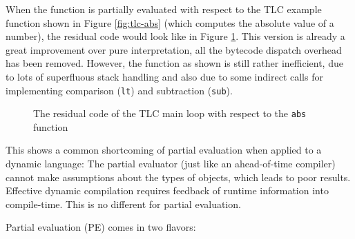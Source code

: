 When the function is partially evaluated with respect to the TLC example
function shown in Figure \ref{fig:tlc-abs} (which computes the absolute value of a number),
the residual code would look like in Figure \ref{fig:tlc-folded}. This version
is already a great improvement over pure interpretation, all the bytecode
dispatch overhead has been removed. However, the function as shown is still
rather inefficient, due to lots of superfluous stack handling and also due to
some indirect calls for implementing comparison (\lstinline{lt}) and
subtraction (\lstinline{sub}).

\begin{figure}[h]
\begin{center}

\caption{The residual code of the TLC main loop with respect to the
\lstinline{abs} function }
\label{fig:tlc-folded}
\end{center}
\end{figure}

This shows a common shortcoming of partial evaluation when applied to a dynamic
language: The partial evaluator (just like an ahead-of-time compiler) cannot
make assumptions about the types of objects, which leads to poor results.
Effective dynamic compilation requires feedback of runtime information into
compile-time. This is no different for partial evaluation.

Partial evaluation (PE) comes in two flavors: 

